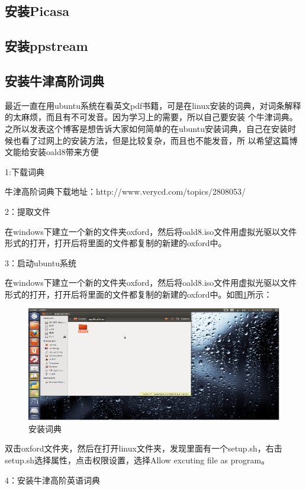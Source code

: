 \subsection{安装Picasa}

\subsection{安装ppstream}

\subsection{安装牛津高阶词典}
最近一直在用ubuntu系统在看英文pdf书籍，可是在linux安装的词典，对词条解释的太麻烦，而且有不可发音。因为学习上的需要，所以自己要安装 个牛津词典。之所以发表这个博客是想告诉大家如何简单的在ubuntu安装词典，自己在安装时候也看了过网上的安装方法，但是比较复杂，而且也不能发音，所 以希望这篇博文能给安装oald8带来方便

1:下载词典

牛津高阶词典下载地址：http://www.verycd.com/topics/2808053/

2：提取文件

在windows下建立一个新的文件夹oxford，然后将oald8.iso文件用虚拟光驱以文件形式的打开，打开后将里面的文件都复制的新建的oxford中。

3：启动ubuntu系统

在windows下建立一个新的文件夹oxford，然后将oald8.iso文件用虚拟光驱以文件形式的打开，打开后将里面的文件都复制的新建的oxford中。如图\ref{oxford}所示：
\begin{figure}
\centering\includegraphics[scale=0.7]{figures/oxford.png}
\caption{安装词典}\label{oxford}
\end{figure}


双击oxford文件夹，然后在打开linux文件夹，发现里面有一个setup.sh，右击setup.sh选择属性，点击权限设置，选择Allow excuting file as program。

4：安装牛津高阶英语词典

